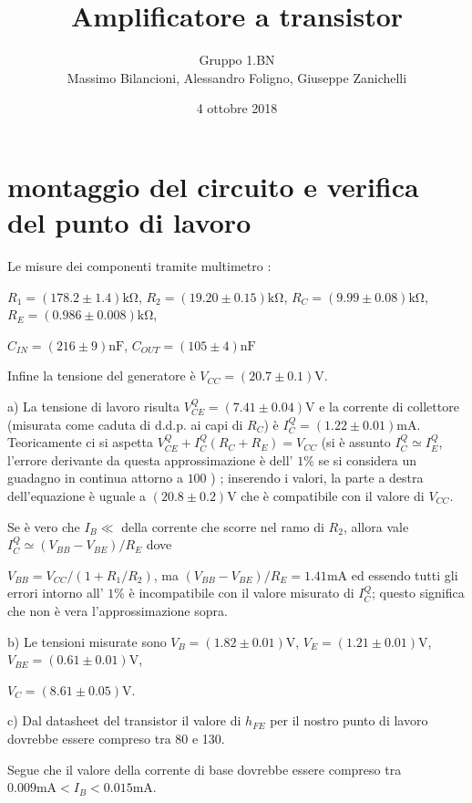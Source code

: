 \documentclass[10pt,a4paper]{article}
\author{Gruppo 1.BN \\ Massimo Bilancioni, Alessandro Foligno, Giuseppe Zanichelli }
\title{Amplificatore a transistor}
\begin{document}
\date{4 ottobre 2018}
\maketitle
\section{montaggio del circuito e verifica del punto di lavoro}

Le misure dei componenti tramite multimetro :

$ R_1 = (178.2\pm 1.4)\si{\kilo\ohm}$, $ R_2 = (19.20\pm 0.15)\si{\kilo\ohm}$, $ R_C = (9.99\pm 0.08)\si{\kilo\ohm}$, $ R_E = (0.986\pm 0.008)\si{\kilo\ohm}$,

 $ C_{IN} = (216 \pm 9)\si{\nano\farad}$, $ C_{OUT} = (105\pm 4)\si{\nano\farad}$

Infine la tensione del generatore è  $V_{CC} = (20.7\pm 0.1)\si{\volt}$.


a) La tensione  di lavoro risulta  $V_{CE}^Q = (7.41 \pm 0.04) \si{\volt}$ e  la corrente di collettore (misurata come caduta di d.d.p. ai capi di $R_C$) è $I_C^Q = (1.22\pm 0.01) \si{\milli\ampere}$. 
Teoricamente ci si aspetta  $V_{CE}^Q + I_C^Q(R_C+ R_E)= V_{CC}$  (si è assunto $I_C^Q \simeq I_E^Q$, l'errore derivante  da questa approssimazione è dell' $1 \%$ se si considera un guadagno in continua attorno a $100$ )
; inserendo i valori, la parte a destra dell'equazione è uguale a $(20.8\pm 0.2)\si{\volt}$ che è compatibile con il valore di $V_{CC}$.

Se è vero che  $I_B \ll$ della corrente che scorre nel ramo di $R_2$, allora vale $I_C^Q \simeq (V_{BB}-V_{BE})/R_E$ dove            

$V_{BB}= V_{CC}/(1+ R_1/R_2)$, ma $(V_{BB}-V_{BE})/R_E= 1.41 \si{\milli\ampere}$ ed essendo tutti gli errori intorno all' $1\%$ è incompatibile con il valore misurato di $I_C^Q$; questo significa che non è vera l'approssimazione sopra.


b) Le tensioni misurate sono $V_B = (1.82\pm 0.01)\si{\volt}$,  $V_E = (1.21\pm 0.01)\si{\volt}$,  $V_{BE} = (0.61\pm 0.01)\si{\volt}$, 

 $V_C = (8.61\pm 0.05)\si{\volt}$.

c) Dal datasheet del transistor il valore di $h_{FE}$ per il nostro punto di lavoro dovrebbe essere compreso tra 80 e 130.

Segue che il valore della corrente di base dovrebbe essere compreso tra $0.009\si{\milli\ampere} < I_B< 0.015\si{\milli\ampere} $.
\end{document}
